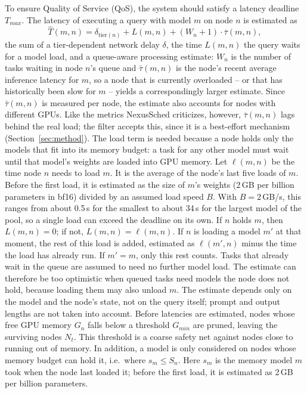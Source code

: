 To ensure Quality of Service (QoS), the system should satisfy a latency deadline $T_{max}$.
The latency of executing a query with model $m$ on node $n$ is estimated as
$$ \hat{T}(m, n) = \delta_{\mathrm{tier}(n)} + L(m, n) + (W_n + 1) \cdot \bar{\tau}(m, n), $$
the sum of a tier-dependent network delay $\delta$, the time $L(m, n)$ the query waits for a model load, and a queue-aware processing estimate:
$W_n$ is the number of tasks waiting in node $n$'s queue and $\bar{\tau}(m, n)$ is the node's recent average inference latency for $m$, so a node that is currently overloaded -- or that has historically been slow for $m$ -- yields a correspondingly larger estimate.
Since $\bar{\tau}(m, n)$ is measured per node, the estimate also accounts for nodes with different GPUs.
Like the metrics NexusSched \cite{nexussched} criticizes, however, $\bar{\tau}(m, n)$ lags behind the real load; the filter accepts this, since it is a best-effort mechanism (Section~\ref{sec:method}).
The load term is needed because a node holds only the models that fit into its memory budget: a task for any other model must wait until that model's weights are loaded into GPU memory.
Let $\ell(m, n)$ be the time node $n$ needs to load $m$. It is the average of the node's last five loads of $m$. Before the first load, it is estimated as the size of $m$'s weights (2\,GB per billion parameters in bf16) divided by an assumed load speed $B$.
With $B = 2$\,GB/s, this ranges from about 0.5\,s for the smallest to about 34\,s for the largest model of the pool, so a single load can exceed the deadline on its own.
If $n$ holds $m$, then $L(m, n) = 0$; if not, $L(m, n) = \ell(m, n)$. If $n$ is loading a model $m'$ at that moment, the rest of this load is added, estimated as $\ell(m', n)$ minus the time the load has already run. If $m' = m$, only this rest counts.
Tasks that already wait in the queue are assumed to need no further model load. The estimate can therefore be too optimistic when queued tasks need models the node does not hold, because loading them may also unload $m$.
The estimate depends only on the model and the node's state, not on the query itself; prompt and output lengths are not taken into account. Before latencies are estimated, nodes whose free GPU memory $G_n$ falls below a threshold $G_{min}$ are pruned, leaving the surviving nodes $N_t$.
This threshold is a coarse safety net against nodes close to running out of memory. In addition, a model is only considered on nodes whose memory budget can hold it, i.e.\ where $s_m \le S_n$.
Here $s_m$ is the memory model $m$ took when the node last loaded it; before the first load, it is estimated as 2\,GB per billion parameters.
